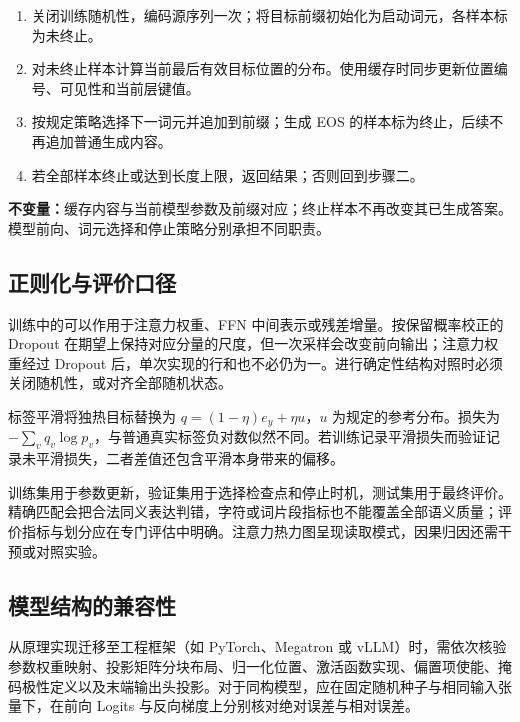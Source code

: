 \documentclass[../textbook.tex]{subfiles}
\begin{document}
\begin{algorithm}[条件生成的自回归执行]
\begin{enumerate}
\item 关闭训练随机性，编码源序列一次；将目标前缀初始化为启动词元，各样本标为未终止。
\item 对未终止样本计算当前最后有效目标位置的分布。使用缓存时同步更新位置编号、可见性和当前层键值。
\item 按规定策略选择下一词元并追加到前缀；生成 EOS 的样本标为终止，后续不再追加普通生成内容。
\item 若全部样本终止或达到长度上限，返回结果；否则回到步骤二。
\end{enumerate}
\textbf{不变量：}缓存内容与当前模型参数及前缀对应；终止样本不再改变其已生成答案。模型前向、词元选择和停止策略分别承担不同职责。
\end{algorithm}

\subsection{正则化与评价口径}
训练中的可以作用于注意力权重、FFN 中间表示或残差增量。按保留概率校正的 Dropout 在期望上保持对应分量的尺度，但一次采样会改变前向输出；注意力权重经过 Dropout 后，单次实现的行和也不必仍为一。进行确定性结构对照时必须关闭随机性，或对齐全部随机状态。

标签平滑将独热目标替换为 $q=(1-\eta)e_y+\eta u$，$u$ 为规定的参考分布。损失为 $-\sum_vq_v\log p_v$，与普通真实标签负对数似然不同。若训练记录平滑损失而验证记录未平滑损失，二者差值还包含平滑本身带来的偏移。

训练集用于参数更新，验证集用于选择检查点和停止时机，测试集用于最终评价。精确匹配会把合法同义表达判错，字符或词片段指标也不能覆盖全部语义质量；评价指标与划分应在专门评估中明确。注意力热力图呈现读取模式，因果归因还需干预或对照实验。

\subsection{模型结构的兼容性}
从原理实现迁移至工程框架（如 PyTorch、Megatron 或 vLLM）时，需依次核验参数权重映射、投影矩阵分块布局、归一化位置、激活函数实现、偏置项使能、掩码极性定义以及末端输出头投影。对于同构模型，应在固定随机种子与相同输入张量下，在前向 Logits 与反向梯度上分别核对绝对误差与相对误差。
\end{document}

